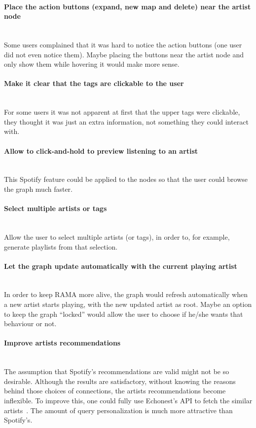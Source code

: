   \paragraph*{Place the action buttons (expand, new map and delete) near the artist node} \hfill \\
  \indent Some users complained that it was hard to notice the action buttons (one user did not even notice them).
  Maybe placing the buttons near the artist node and only show them while hovering it would make more sense.

  \paragraph*{Make it clear that the tags are clickable to the user} \hfill \\
  \indent For some users it was not apparent at first that the upper tags were clickable, they thought it was just an extra information, not something they could interact with.

  \paragraph*{Allow to click-and-hold to preview listening to an artist} \hfill \\
  \indent This Spotify feature could be applied to the nodes so that the user could browse the graph much faster.

  \paragraph*{Select multiple artists or tags} \hfill \\
  \indent Allow the user to select multiple artists (or tags), in order to, for example, generate playlists from that selection.

  \paragraph*{Let the graph update automatically with the current playing artist} \hfill \\
  \indent In order to keep RAMA more alive, the graph would refresh automatically when a new artist starts playing, with the new updated artist as root.
  Maybe an option to keep the graph ``locked'' would allow the user to choose if he/she wants that behaviour or not.

  \paragraph*{Improve artists recommendations} \hfill \\
  \indent The assumption that Spotify's recommendations are valid might not be so desirable.
  Although the results are satisfactory, without knowing the reasons behind those choices of connections, the artists recommendations become inflexible.
  To improve this, one could fully use Echonest's API to fetch the similar artists~\cite{echonestsimilar}.
  The amount of query personalization is much more attractive than Spotify's.

